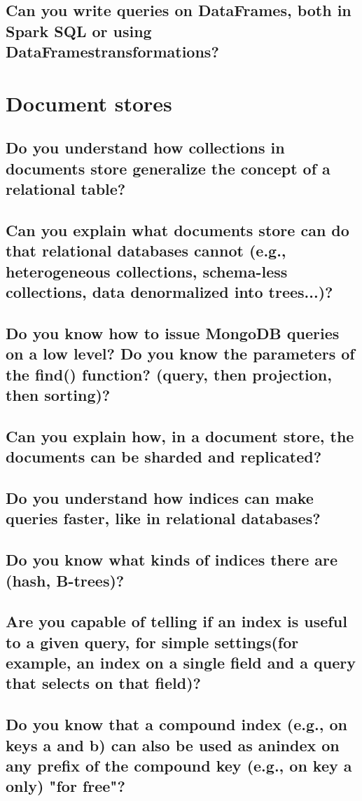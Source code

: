\documentclass{article}
\begin{document}
\subsection{Can you write queries on DataFrames, both in Spark SQL or using DataFramestransformations?}

\pagebreak

\section{Document stores}
\subsection{Do you understand how collections in documents store generalize the concept of a relational table?}
\subsection{Can you explain what documents store can do that relational databases cannot (e.g., heterogeneous collections, schema-less collections, data denormalized into trees...)?}
\subsection{Do you know how to issue MongoDB queries on a low level? Do you know the parameters of the find() function? (query, then projection, then sorting)?}
\subsection{Can you explain how, in a document store, the documents can be sharded and replicated?}
\subsection{Do you understand how indices can make queries faster, like in relational databases?}
\subsection{Do you know what kinds of indices there are (hash, B-trees)?}
\subsection{Are you capable of telling if an index is useful to a given query, for simple settings(for example, an index on a single field and a query that selects on that field)?}
\subsection{Do you know that a compound index (e.g., on keys a and b) can also be used as anindex on any prefix of the compound key (e.g., on key a only) "for free"?}
\end{document}
